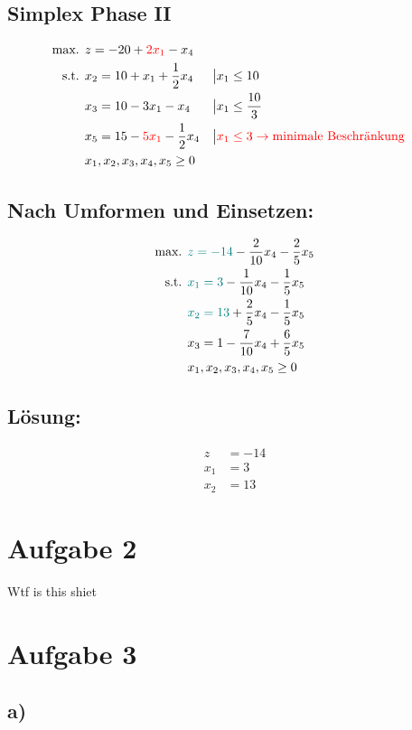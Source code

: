 \documentclass[a4paper,11pt]{article}
\begin{document}
\subsection*{Simplex Phase II}
\begin{align*}
\text{max. } & z = -20 + {\color{red} 2x_1} - x_4 \\
\text{s.t. } & x_2 = 10 + x_1 + \frac{1}{2}x_4 &&\big| x_1 \le 10 \\
& x_3 = 10 - 3x_1 - x_4 &&\big| x_1 \le \frac{10}{3} \\
& x_5 = 15 - {\color{red} 5x_1} - \frac{1}{2}x_4 &&\big| \color{red} x_1 \le 3 \to \text{minimale Beschränkung} \\
& x_1, x_2, x_3, x_4, x_5 \ge 0
\end{align*}

\subsection*{Nach Umformen und Einsetzen:}
\begin{align*}
\text{max. } & {\color{teal} z = -14} - \frac{2}{10}x_4 - \frac{2}{5}x_5 \\
\text{s.t. } & {\color{teal} x_1 = 3} - \frac{1}{10}x_4 - \frac{1}{5}x_5 \\
& {\color{teal} x_2 = 13} + \frac{2}{5}x_4 - \frac{1}{5}x_5 \\
& x_3 = 1 - \frac{7}{10}x_4 + \frac{6}{5}x_5 \\
& x_1, x_2, x_3, x_4, x_5 \ge 0
\end{align*}

\subsection*{Lösung:}
\begin{align*}
z &= -14 \\
x_1 &= 3 \\
x_2 &= 13
\end{align*}


\section*{Aufgabe 2}
Wtf is this shiet

\section*{Aufgabe 3}
\subsection*{a)}
\end{document}
